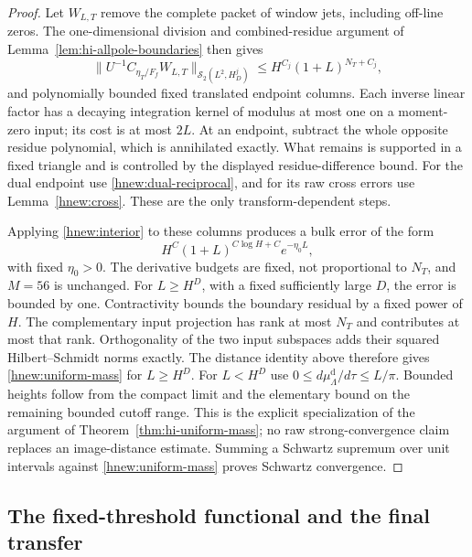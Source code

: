 \begin{proof}
Let $W_{L,T}$ remove the complete packet of window jets, including
off-line zeros.  The one-dimensional division and combined-residue
argument of Lemma~\ref{lem:hi-allpole-boundaries} then gives
\[
 \|U^{-1}C_{\eta_T/F_f}W_{L,T}\|_{\mathcal S_2(L^2,H_D^j)}
       \le H^{C_j}(1+L)^{N_T+C_j},
\]
and polynomially bounded fixed translated endpoint columns.
Each inverse linear factor has a decaying integration kernel
of modulus at most one on a moment-zero input; its cost is
at most $2L$.  At an endpoint, subtract the whole opposite
residue polynomial, which is annihilated exactly.  What remains
is supported in a fixed triangle and is controlled by the
displayed residue-difference bound.
For the dual endpoint use \eqref{hnew:dual-reciprocal}, and for
its raw cross errors use Lemma~\ref{hnew:cross}.
These are the only transform-dependent steps.

Applying \eqref{hnew:interior} to these columns produces a bulk
error of the form
\begin{equation}\label{hnew:height-error}
 H^C(1+L)^{C\log H+C}e^{-\eta_0L},
\end{equation}
with fixed $\eta_0>0$.  The derivative budgets are fixed,
not proportional to $N_T$, and $M=56$ is unchanged.
For $L\ge H^D$, with a fixed sufficiently large $D$, the error
is bounded by one.  Contractivity bounds the boundary residual
by a fixed power of $H$.  The complementary input projection
has rank at most $N_T$ and contributes at most that rank.
Orthogonality of the two input subspaces adds their squared
Hilbert--Schmidt norms exactly.  The distance identity above
therefore gives \eqref{hnew:uniform-mass} for $L\ge H^D$.
For $L<H^D$ use $0\le d\mu_\Lambda^{\mathrm d}/d\tau\le L/\pi$.
Bounded heights follow from the compact limit and the elementary
bound on the remaining bounded cutoff range.
This is the explicit specialization of the argument of
Theorem~\ref{thm:hi-uniform-mass}; no raw strong-convergence
claim replaces an image-distance estimate.
Summing a Schwartz supremum over unit intervals against
\eqref{hnew:uniform-mass} proves Schwartz convergence.
\end{proof}

\subsection{The fixed-threshold functional and the final transfer}


